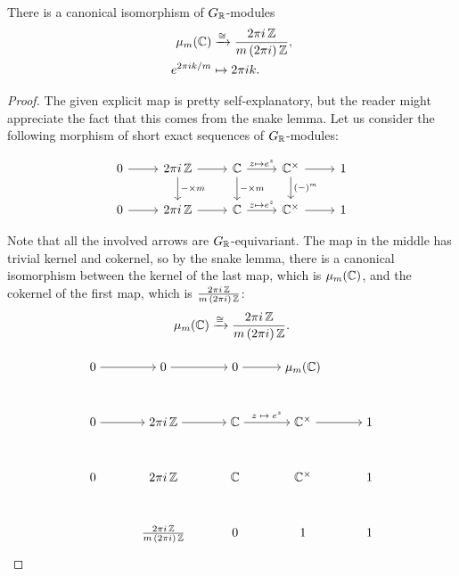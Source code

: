 \begin{lemma}
  There is a canonical isomorphism of $G_{\mathbb{R}}$-modules
  \begin{align*}
    \mu_m (\mathbb{C}) & \xrightarrow{\cong} \frac{2\pi i \, \mathbb{Z}}{m\,(2\pi i)\,\mathbb{Z}},\\
    e^{2\pi i k/m} & \mapsto 2\pi i k.
  \end{align*}

  \begin{proof}
    The given explicit map is pretty self-explanatory, but the reader might
    appreciate the fact that this comes from the snake lemma. Let us consider
    the following morphism of short exact sequences of $G_{\mathbb{R}}$-modules:

    \[ \begin{tikzcd}
        0 \ar{r} & 2\pi i \, \ZZ \ar{r}\ar{d}{-\times m} & \CC \ar{r}{z\mapsto e^z}\ar{d}{-\times m} & \CC^\times \ar{r}\ar{d}{(-)^m} & 1 \\
        0 \ar{r} & 2\pi i \, \ZZ \ar{r} & \CC \ar{r}{z\mapsto e^z} & \CC^\times \ar{r} & 1
      \end{tikzcd} \]

    Note that all the involved arrows are $G_{\mathbb{R}}$-equivariant. The map in the
    middle has trivial kernel and cokernel, so by the snake lemma, there is a
    canonical isomorphism between the kernel of the last map, which is
    $\mu_m (\mathbb{C})$, and the cokernel of the first map, which is
    $\frac{2\pi i \, \mathbb{Z}}{m \, (2\pi i)\,\mathbb{Z}}$:
    $$\mu_m (\mathbb{C}) \xrightarrow{\cong} \frac{2\pi i \, \mathbb{Z}}{m \, (2\pi i)\,\mathbb{Z}}.$$

    \[ \begin{tikzpicture}
        \matrix(m)[matrix of math nodes, row sep=3em, column sep=3em, text height=1.5ex, text depth=0.25ex]{
          0 & 0 & 0 & \mu_m (\CC) & ~ \\
          0 & 2\pi i\,\ZZ & \CC & \CC^\times & 1 \\
          0 & 2\pi i\,\ZZ & \CC & \CC^\times & 1 \\
          ~ & \frac{2\pi i\,\ZZ}{m\,(2\pi i)\,\ZZ} & 0 & 1 & 1\\};

        \path[->] (m-1-1) edge (m-1-2);
        \path[->] (m-1-2) edge (m-1-3);
        \path[->] (m-1-3) edge (m-1-4);

        \path[->] (m-2-1) edge (m-2-2);
        \path[->] (m-2-2) edge (m-2-3);
        \path[->,font=\scriptsize] (m-2-3) edge node[above] {$z\mapsto e^z$} (m-2-4);
        \path[->] (m-2-4) edge (m-2-5);


\end{tikzpicture}\]
\end{proof}
\end{lemma}
